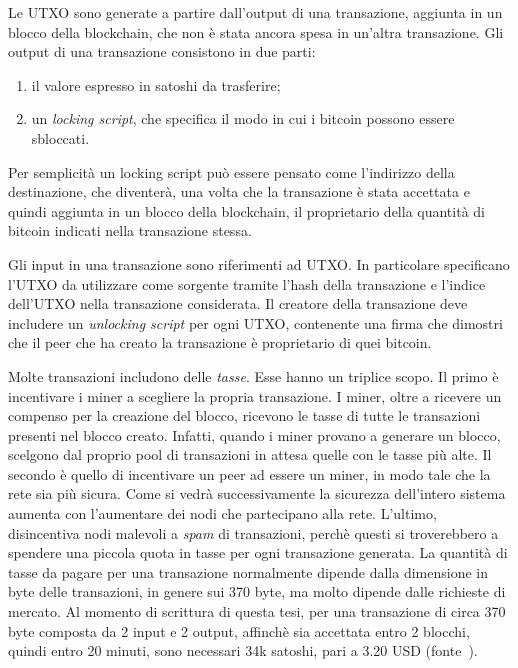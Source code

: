 Le UTXO sono generate a partire dall'output di una transazione, aggiunta in un blocco della blockchain, che non è stata ancora spesa in un'altra transazione. Gli output di una transazione consistono in due parti:

\begin{enumerate}
	\item il valore espresso in satoshi da trasferire;
	\item un \emph{locking script}, che specifica il modo in cui i bitcoin possono essere sbloccati.
\end{enumerate}

Per semplicità un locking script può essere pensato come l'indirizzo della destinazione, che diventerà, una volta che la transazione è stata accettata e quindi aggiunta in un blocco della blockchain, il proprietario della quantità di bitcoin indicati nella transazione stessa.

Gli input in una transazione sono riferimenti ad UTXO. In particolare specificano l'UTXO da utilizzare come sorgente tramite l'hash della transazione e l'indice dell'UTXO nella transazione considerata. Il creatore della transazione deve includere un \emph{unlocking script} per ogni UTXO, contenente una firma che dimostri che il peer che ha creato la transazione è proprietario di quei bitcoin.

Molte transazioni includono delle \emph{tasse}. Esse hanno un triplice scopo. Il primo è incentivare i miner a scegliere la propria transazione. I miner, oltre a ricevere un compenso per la creazione del blocco, ricevono le tasse di tutte le transazioni presenti nel blocco creato. Infatti, quando i miner provano a generare un blocco, scelgono dal proprio pool di transazioni in attesa quelle con le tasse più alte. Il secondo è quello di incentivare un peer ad essere un miner, in modo tale che la rete sia più sicura. Come si vedrà successivamente la sicurezza dell'intero sistema aumenta con l'aumentare dei nodi che partecipano alla rete. L'ultimo, disincentiva nodi malevoli a \emph{spam} di transazioni, perchè questi si troverebbero a spendere una piccola quota in tasse per ogni transazione generata. La quantità di tasse da pagare per una transazione normalmente dipende dalla dimensione in byte delle transazioni, in genere sui 370 byte, ma molto dipende dalle richieste di mercato. Al momento di scrittura di questa tesi, per una transazione di circa 370 byte composta da 2 input e 2 output, affinchè sia accettata entro 2 blocchi, quindi entro 20 minuti, sono necessari 34k satoshi, pari a 3.20 USD (fonte~\cite{bitcoin_fee_calculator}).

